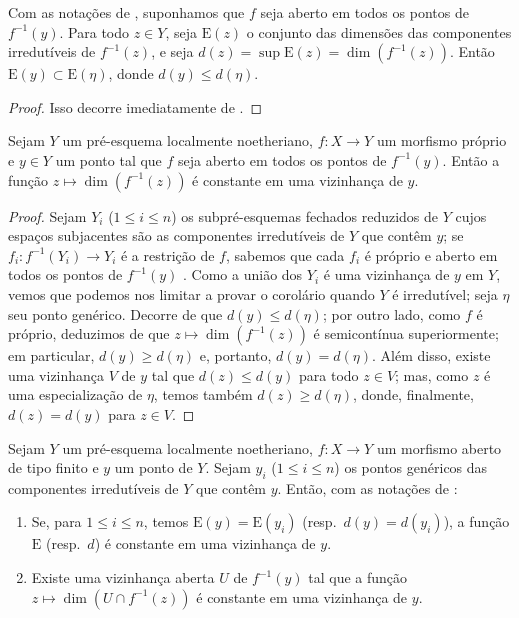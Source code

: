 \begin{corollary}[14.2.4]
\label{IV.14.2.4}
Com as notações de , suponhamos que $f$ seja aberto em todos os pontos de $f^{-1}(y)$.
Para todo $z\in Y$, seja $\mathrm{E}(z)$ o conjunto das dimensões das componentes irredutíveis de $f^{-1}(z)$, e seja $d(z)=\sup\mathrm{E}(z)=\dim(f^{-1}(z))$.
Então $\mathrm{E}(y)\subset\mathrm{E}(\eta)$, donde $d(y)\leq d(\eta)$.
\end{corollary}

\begin{proof}
Isso decorre imediatamente de .
\end{proof}

\begin{corollary}[14.2.5]
\label{IV.14.2.5}
Sejam $Y$ um pré-esquema localmente noetheriano, $f:X\to Y$ um morfismo próprio e $y\in Y$ um ponto tal que $f$ seja aberto em todos os pontos de $f^{-1}(y)$.
Então a função $z\mapsto\dim(f^{-1}(z))$ é constante em uma vizinhança de $y$.
\end{corollary}

\begin{proof}
Sejam $Y_i$ ($1\leq i\leq n$) os subpré-esquemas fechados reduzidos de $Y$ cujos espaços subjacentes são as componentes irredutíveis de $Y$ que contêm $y$; se $f_i:f^{-1}(Y_i)\to Y_i$ é a restrição de $f$, sabemos que cada $f_i$ é próprio  e aberto em todos os pontos de $f^{-1}(y)$ .
Como a união dos $Y_i$ é uma vizinhança de $y$ em $Y$,
vemos que podemos nos limitar a provar o corolário quando $Y$ é irredutível; seja $\eta$ seu ponto genérico.
Decorre de  que $d(y)\leq d(\eta)$; por outro lado, como $f$ é próprio, deduzimos de  que $z\mapsto\dim(f^{-1}(z))$ é semicontínua superiormente; em particular, $d(y)\geq d(\eta)$ e, portanto, $d(y)=d(\eta)$.
Além disso, existe uma vizinhança $V$ de $y$ tal que $d(z)\leq d(y)$ para todo $z\in V$; mas, como $z$ é uma especialização de $\eta$, temos também $d(z)\geq d(\eta)$, donde, finalmente, $d(z)=d(y)$ para $z\in V$.
\end{proof}

\begin{corollary}[14.2.6]
\label{IV.14.2.6}
Sejam $Y$ um pré-esquema localmente noetheriano, $f:X\to Y$ um morfismo aberto de tipo finito e $y$ um ponto de $Y$.
Sejam $y_i$ ($1\leq i\leq n$) os pontos genéricos das componentes irredutíveis de $Y$ que contêm $y$.
Então, com as notações de :
\begin{enumerate}[label=(\roman*)]
  \item Se, para $1\leq i\leq n$, temos $\mathrm{E}(y)=\mathrm{E}(y_i)$ (resp.\ $d(y)=d(y_i)$), a função $\mathrm{E}$ (resp.\ $d$) é constante em uma vizinhança de $y$.
  \item Existe uma vizinhança aberta $U$ de $f^{-1}(y)$ tal que a função $z\mapsto\dim(U\cap f^{-1}(z))$ é constante em uma vizinhança de $y$.
\end{enumerate}
\end{corollary}

